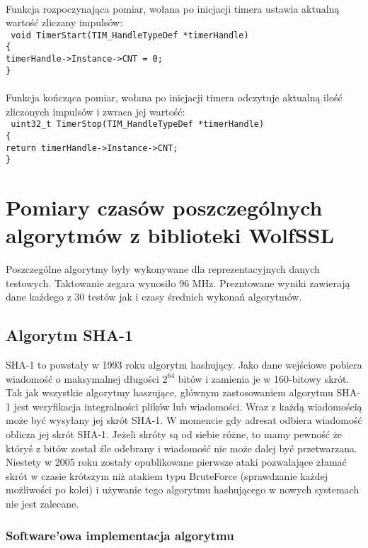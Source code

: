 \documentclass[oneside]{mgr}
\begin{document}
\\Funkcja rozpoczynająca pomiar, wołana po inicjacji timera ustawia aktualną wartość zliczany impulsów:\\
\texttt{
void TimerStart(TIM\_HandleTypeDef *timerHandle)\\
\{\\
\hspace*{10mm}timerHandle->Instance->CNT = 0;\\
\}\\
}
\\Funkcja kończąca pomiar, wołana po inicjacji timera odczytuje aktualną ilość zliczonych impulsów i zwraca jej wartość:\\
\texttt{
uint32\_t TimerStop(TIM\_HandleTypeDef *timerHandle)\\
\{\\
\hspace*{10mm}return timerHandle->Instance->CNT;\\
\}
}
\chapter{Pomiary czasów poszczególnych algorytmów z biblioteki WolfSSL}

Poszczególne algorytmy były wykonywane dla reprezentacyjnych danych testowych. Taktowanie zegara wynosiło 96 MHz. Prezntowane wyniki zawierają dane każdego z 30 testów jak i czasy średnich wykonań algorytmów.
\section{Algorytm SHA-1}

SHA-1 to powstały w 1993 roku algorytm hashujący. Jako dane wejściowe pobiera wiadomość o maksymalnej długości $2^{64}$ bitów i zamienia je w 160-bitowy skrót. Tak jak wszystkie algorytmy haszujące, głównym zastosowaniem algorytmu SHA-1 jest weryfikacja integralności plików lub wiadomości. Wraz z każdą wiadomością może być wysyłany jej skrót SHA-1. W momencie gdy adresat odbiera wiadomość oblicza jej skrót SHA-1. Jeżeli skróty są od siebie różne, to mamy pewność że któryś z bitów został źle odebrany i wiadomość nie może dalej być przetwarzana. Niestety w 2005 roku zostały opublikowane pierwsze ataki pozwalające złamać skrót w czasie krótszym niż atakiem typu BruteForce (sprawdzanie każdej możliwości po kolei) i używanie tego algorytmu hashującego w nowych systemach nie jest zalecane. 

\subsection{Software'owa implementacja algorytmu}
\end{document}
